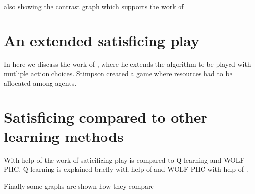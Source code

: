 also showing the contrast graph which supports the work of \citep{arthur}

\section{An extended satisficing play}
\drafting

In here we discuss the work of \citep{stimpson:2003}, where he extends the
algorithm to be played with mutliple action choices.
Stimpson created a game where resources had to be allocated among agents.

\section{Satisficing compared to other learning methods}
\drafting

With help of the work of \citep{crandall} saticificing play is compared
to Q-learning and WOLF-PHC.
Q-learning is explained briefly with help of \citep{sandholm} and WOLF-PHC
with help of \citep{bowling}.
 
Finally some graphs are shown how they compare



\address{Jappie Klooster\\
  Dept. of Informatics\\
  Universiteit Utrecht\\
  The Netherlands\\}

